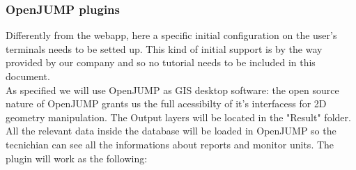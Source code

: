 \subsubsection{OpenJUMP plugins}
Differently from the webapp, here a specific initial configuration on the user's terminals needs to be setted up.
This kind of initial support is by the way provided by our company and so no tutorial needs to be included in this document. \\
As specified we will use OpenJUMP as GIS desktop software: the open source nature of OpenJUMP grants us the full acessibilty of it's interfacess for 2D geometry manipulation.
The Output layers will be located in the "Result" folder. All the relevant data inside the database will be loaded in OpenJUMP so the tecnichian can see all the informations about reports and monitor units.
The plugin will work as the following:

